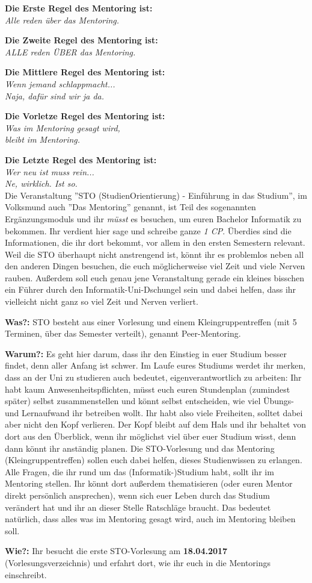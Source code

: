 \spaltenanfang
\textbf{Die Erste Regel des Mentoring ist:}\\ \textit{Alle reden über das Mentoring.}

\textbf{Die Zweite Regel des Mentoring ist:}\\ \textit{ALLE reden ÜBER das Mentoring.}

\textbf{Die Mittlere Regel des Mentoring ist:}\\ \textit{Wenn jemand schlappmacht...\\ Naja, dafür sind wir ja da.}

\textbf{Die Vorletze Regel des Mentoring ist:}\\ \textit{Was im Mentoring gesagt wird,\\ bleibt im Mentoring.}

\textbf{Die Letzte Regel des Mentoring ist:}\\ \textit{Wer neu ist muss rein...\\ Ne, wirklich. Ist so.}\\

Die Veranstaltung ''STO (StudienOrientierung) - Einführung in das Studium'', im Volksmund auch ''Das Mentoring'' genannt, ist Teil des sogenannten Ergänzungsmoduls und ihr \emph{müsst} es besuchen, um euren Bachelor Informatik zu bekommen. Ihr verdient hier sage und schreibe ganze \emph{1 CP}. Überdies sind die Informationen, die ihr dort bekommt, vor allem in den ersten Semestern relevant. Weil die STO überhaupt nicht anstrengend ist, könnt ihr es problemlos neben all den anderen Dingen besuchen, die euch möglicherweise viel Zeit und viele Nerven rauben. Außerdem soll euch genau jene Veranstaltung gerade ein kleines bisschen ein Führer durch den Informatik-Uni-Dschungel sein und dabei helfen, dass ihr vielleicht nicht ganz so viel Zeit und Nerven verliert.

\textbf{Was?:} STO besteht aus einer Vorlesung und einem Kleingruppentreffen (mit 5 Terminen, über das Semester verteilt), genannt Peer-Mentoring.

\textbf{Warum?:} Es geht hier darum, dass ihr den Einstieg in euer Studium besser findet, denn aller Anfang ist schwer. Im Laufe eures Studiums werdet ihr merken, dass an der Uni zu studieren auch bedeutet, eigenverantwortlich zu arbeiten: Ihr habt kaum Anwesenheitspflichten, müsst euch euren Stundenplan (zumindest später) selbst zusammenstellen und könnt selbst entscheiden, wie viel Übungs- und Lernaufwand ihr betreiben wollt.
Ihr habt also viele Freiheiten, solltet dabei aber nicht den Kopf verlieren. Der Kopf bleibt auf dem Hals und ihr behaltet von dort aus den Überblick, wenn ihr möglichst viel über euer Studium wisst, denn dann könnt ihr anständig planen.
Die STO-Vorlesung und das Mentoring (Kleingruppentreffen) sollen euch dabei helfen, dieses Studienwissen zu erlangen. Alle Fragen, die ihr rund um das (Informatik-)Studium habt, sollt ihr im Mentoring stellen. Ihr könnt dort außerdem thematisieren (oder euren Mentor direkt persönlich ansprechen), wenn sich euer Leben durch das Studium verändert hat und ihr an dieser Stelle Ratschläge braucht. Das bedeutet natürlich, dass alles was im Mentoring gesagt wird, auch im Mentoring bleiben soll.

\textbf{Wie?:} Ihr besucht die erste STO-Vorlesung am \textbf{18.04.2017} (Vorlesungsverzeichnis) und erfahrt dort, wie ihr euch in die Mentorings einschreibt.
\spaltenende
